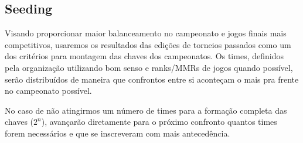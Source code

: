 \subsection{Seeding}

Visando proporcionar maior balanceamento no campeonato e jogos finais mais competitivos, usaremos os resultados das edições de torneios passados como um dos critérios para montagem das chaves dos campeonatos. Os times, definidos pela organização utilizando bom senso e ranks/MMRs de jogos quando possível, serão distribuídos de maneira que confrontos entre si aconteçam o mais pra frente no campeonato possível.

No caso de não atingirmos um número de times para a formação completa das chaves (\(2^n\)), avançarão diretamente para o próximo confronto quantos times forem necessários e que se inscreveram com mais antecedência.
